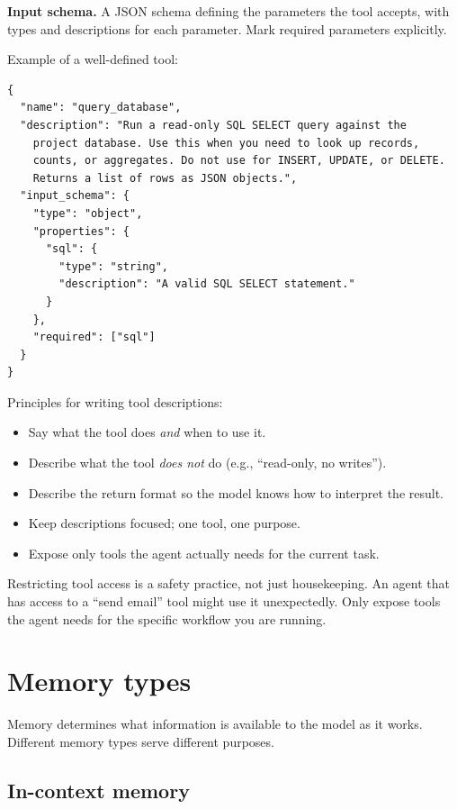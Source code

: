 \textbf{Input schema.} A JSON schema defining the parameters the tool accepts, with types and descriptions for each parameter. Mark required parameters explicitly.

Example of a well-defined tool:

\begin{verbatim}
{
  "name": "query_database",
  "description": "Run a read-only SQL SELECT query against the
    project database. Use this when you need to look up records,
    counts, or aggregates. Do not use for INSERT, UPDATE, or DELETE.
    Returns a list of rows as JSON objects.",
  "input_schema": {
    "type": "object",
    "properties": {
      "sql": {
        "type": "string",
        "description": "A valid SQL SELECT statement."
      }
    },
    "required": ["sql"]
  }
}
\end{verbatim}

Principles for writing tool descriptions:

\begin{itemize}[noitemsep,topsep=0pt]
  \item Say what the tool does \emph{and} when to use it.
  \item Describe what the tool \emph{does not} do (e.g., ``read-only, no writes'').
  \item Describe the return format so the model knows how to interpret the result.
  \item Keep descriptions focused; one tool, one purpose.
  \item Expose only tools the agent actually needs for the current task.
\end{itemize}

Restricting tool access is a safety practice, not just housekeeping. An agent that has access to a ``send email'' tool might use it unexpectedly. Only expose tools the agent needs for the specific workflow you are running.

\section{Memory types}

Memory determines what information is available to the model as it works. Different memory types serve different purposes.

\subsection{In-context memory}

